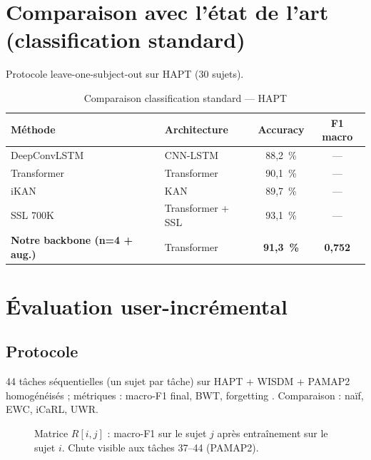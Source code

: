 \section{Comparaison avec l'état de l'art (classification standard)}

Protocole leave-one-subject-out sur HAPT (30 sujets).

\begin{table}[H]
\centering
\small
\begin{tabularx}{\textwidth}{|Y|Y|c|c|}
\hline
\textbf{Méthode} & \textbf{Architecture} & \textbf{Accuracy} & \textbf{F1 macro} \\
\hline
DeepConvLSTM \parencite{ordonyez2016} & CNN-LSTM    & 88,2~\% & — \\
Transformer \parencite{dirgova2022}   & Transformer & 90,1~\% & — \\
iKAN \parencite{liu2024}               & KAN         & 89,7~\% & — \\
SSL 700K \parencite{yuan2024}         & Transformer + SSL & 93,1~\% & — \\
\textbf{Notre backbone (n=4 + aug.)}  & Transformer & \textbf{91,3~\%} & \textbf{0,752} \\
\hline
\end{tabularx}
\caption{Comparaison classification standard — HAPT}
\label{tab:sota_har}
\end{table}

\section{Évaluation user-incrémental}

\subsection{Protocole}

44 tâches séquentielles (un sujet par tâche) sur HAPT + WISDM + PAMAP2
homogénéisés ; métriques : macro-F1 final, BWT, forgetting
\parencite{delange2021}. Comparaison : naïf, EWC, iCaRL, UWR.

\begin{figure}[H]
  \centering
  \caption[Matrice user-incrémental]{Matrice $R[i,j]$ : macro-F1 sur le sujet $j$
  après entraînement sur le sujet $i$. Chute visible aux tâches 37--44 (PAMAP2).}
  \label{fig:matrix_user}
\end{figure}

